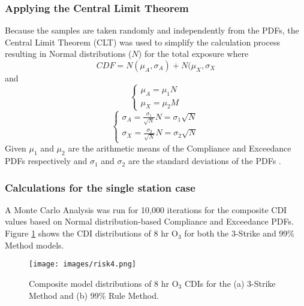 \subsubsection{Applying the Central Limit Theorem}

Because the samples are taken randomly and independently from the PDFs, the Central Limit Theorem (CLT) was used to simplify the calculation process resulting in Normal distributions ($N$) for the total exposure where
%
\begin{equation}
\label{eq4:cdfN}
CDF=N(\mu_{A},\sigma_{A})+N(\mu_{X},\sigma_{X}
\end{equation}
%
\noindent
and
%
\begin{equation}
\label{eq5:cdfmu}
\left\{\begin{matrix}
\mu_{A} = \mu_{1}N
\\ 
\mu_{X} = \mu_{2}M
\end{matrix}\right.
\end{equation}
%
\begin{equation}
\label{eq6:cdfsigma}
\left\{\begin{matrix}
\sigma_{A} = \frac{\sigma_{1}}{\sqrt{N}}N = \sigma_{1}\sqrt{N}
\\ 
\sigma_{X} = \frac{\sigma_{2}}{\sqrt{N}}N = \sigma_{2}\sqrt{N}
\end{matrix}\right.
\end{equation}
%
Given $\mu_{1}$ and $\mu_{2}$ are the arithmetic means of the Compliance and Exceedance PDFs respectively and $\sigma_{1}$ and $\sigma_{2}$ are the standard deviations of the PDFs \citep{Ott1981}. 

\subsubsection{Calculations for the single station case}

A Monte Carlo Analysis was run for 10,000 iterations for the composite CDI values based on Normal distribution-based Compliance and Exceedance PDFs.  Figure \ref{fig4:composite} shows the CDI distributions of 8 hr O$_{3}$ for both the 3-Strike and 99\% Method models. 
%  
\begin{figure}[H]
\texttt{[image: images/risk4.png]} 
\caption[Composite model distributions of 8 hr O$_{3}$ CDIs]{Composite model distributions of 8 hr O$_{3}$ CDIs for the (a) 3-Strike Method and (b) 99\% Rule Method.}
\label{fig4:composite}
\end{figure}
%

